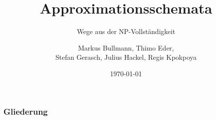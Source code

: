 \documentclass[aspectratio=169,babel]{beamer}
\title{Approximationsschemata}
\subtitle{Wege aus der NP-Vollständigkeit}
\author{Markus Bullmann, Thimo Eder, \\ Stefan Gerasch, Julius Hackel, Regis Kpokpoya}
\date{\today}
\begin{document}
    \maketitle
    \begin{frame}
        \frametitle{Gliederung}
        \tableofcontents
    \end{frame}
    
    
    
    
    
    
\end{document}
